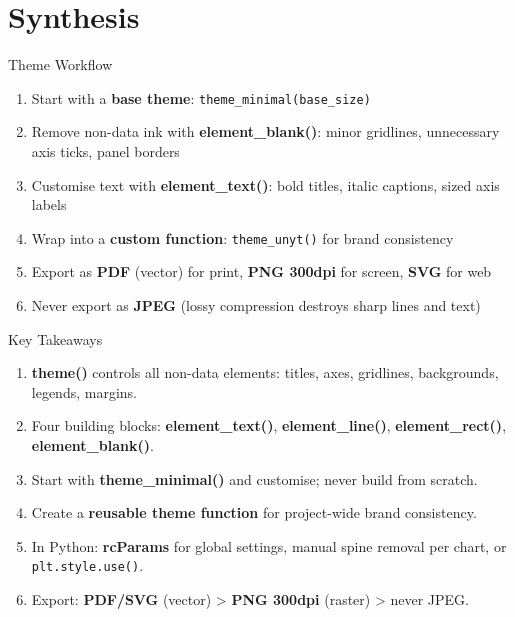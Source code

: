 \documentclass[10pt]{beamer}
\begin{document}
\section{Synthesis}

\begin{frame}{Theme Workflow}
  \begin{enumerate}
    \item Start with a \textbf{base theme}: \texttt{theme\_minimal(base\_size)}
    \item Remove non-data ink with \textbf{element\_blank()}: minor gridlines,
          unnecessary axis ticks, panel borders
    \item Customise text with \textbf{element\_text()}: bold titles, italic
          captions, sized axis labels
    \item Wrap into a \textbf{custom function}: \texttt{theme\_unyt()} for
          brand consistency
    \item Export as \textbf{PDF} (vector) for print, \textbf{PNG 300dpi}
          for screen, \textbf{SVG} for web
    \item Never export as \textbf{JPEG} (lossy compression destroys
          sharp lines and text)
  \end{enumerate}
\end{frame}

\begin{frame}{Key Takeaways}
  \begin{enumerate}
    \item \textbf{theme()} controls all non-data elements: titles, axes,
          gridlines, backgrounds, legends, margins.
    \item Four building blocks: \textbf{element\_text()}, \textbf{element\_line()},
          \textbf{element\_rect()}, \textbf{element\_blank()}.
    \item Start with \textbf{theme\_minimal()} and customise; never build
          from scratch.
    \item Create a \textbf{reusable theme function} for project-wide
          brand consistency.
    \item In Python: \textbf{rcParams} for global settings, manual spine
          removal per chart, or \texttt{plt.style.use()}.
    \item Export: \textbf{PDF/SVG} (vector) > \textbf{PNG 300dpi} (raster)
          > never JPEG.
  \end{enumerate}
\end{frame}
\end{document}
